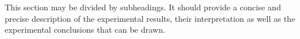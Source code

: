 \label{sec:measurements}

This section may be divided by subheadings. It should provide a concise and precise description of the experimental results, their interpretation as well as the experimental conclusions that can be drawn.

